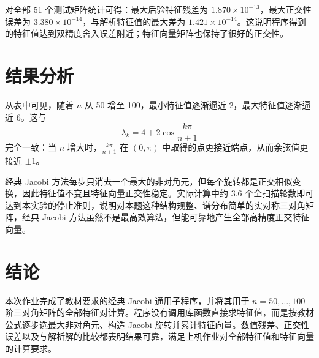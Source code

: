 \documentclass[a4paper,11pt]{article}
\begin{document}
对全部 51 个测试矩阵统计可得：最大后验特征残差为
$1.870\times10^{-13}$，最大正交性误差为 $3.380\times10^{-14}$，与解析特征值的最大差为
$1.421\times10^{-14}$。这说明程序得到的特征值达到双精度舍入误差附近；特征向量矩阵也保持了很好的正交性。

\section{结果分析}
从表中可见，随着 $n$ 从 50 增至 100，最小特征值逐渐逼近 $2$，最大特征值逐渐逼近 $6$。这与
\[
    \lambda_k=4+2\cos\frac{k\pi}{n+1}
\]
完全一致：当 $n$ 增大时，$\frac{k\pi}{n+1}$ 在 $(0,\pi)$ 中取得的点更接近端点，从而余弦值更接近 $\pm 1$。

经典 Jacobi 方法每步只消去一个最大的非对角元，但每个旋转都是正交相似变换，因此特征值不变且特征向量正交性稳定。实际计算中约 $3.6$ 个全扫描轮数即可达到本实验的停止准则，说明对本题这种结构规整、谱分布简单的实对称三对角矩阵，经典 Jacobi 方法虽然不是最高效算法，但能可靠地产生全部高精度正交特征向量。

\section{结论}
本次作业完成了教材要求的经典 Jacobi 通用子程序，并将其用于 $n=50,\ldots,100$ 阶三对角矩阵的全部特征对计算。程序没有调用库函数直接求特征值，而是按教材公式逐步选最大非对角元、构造 Jacobi 旋转并累计特征向量。数值残差、正交性误差以及与解析解的比较都表明结果可靠，满足上机作业对全部特征值和特征向量的计算要求。
\end{document}
